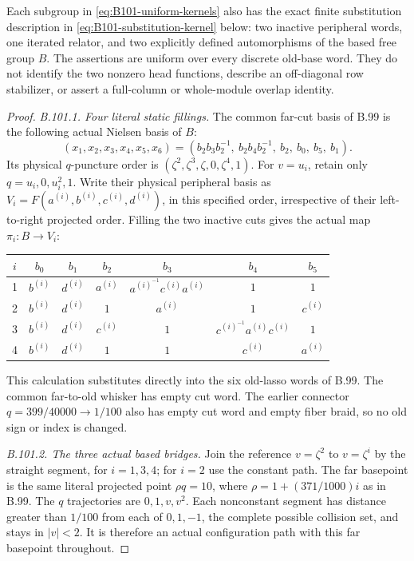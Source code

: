 Each subgroup in \eqref{eq:B101-uniform-kernels} also has the exact
finite substitution description in \eqref{eq:B101-substitution-kernel}
below: two inactive peripheral words, one iterated relator, and two
explicitly defined automorphisms of the based free group $B$.
The assertions are uniform over every discrete old-base word.
They do not identify the two nonzero head functions, describe an
off-diagonal row stabilizer, or assert a full-column or whole-module
overlap identity.

\begin{proof}
\emph{B.101.1. Four literal static fillings.}
The common far-cut basis of B.99 is the following actual Nielsen basis
of $B$:
\begin{equation}\label{eq:B101-six-cut-basis}
 (x_1,x_2,x_3,x_4,x_5,x_6)
 =(b_2b_3b_2^{-1},\ b_2b_4b_2^{-1},\ b_2,\ b_0,\ b_5,\ b_1).
\end{equation}
Its physical $q$-puncture order is
$(\zeta^2,\zeta^3,\zeta,0,\zeta^4,1)$.
For $v=u_i$, retain only $q=u_i,0,u_i^2,1$.
Write their physical peripheral basis as
$V_i=F(a^{(i)},b^{(i)},c^{(i)},d^{(i)})$, in this specified order, irrespective of
their left-to-right projected order.
Filling the two inactive cuts gives the actual map $\pi_i:B\to V_i$:
\begin{center}
\small
\begin{tabular}{c@{\qquad}cccccc}
\toprule
$i$&$b_0$&$b_1$&$b_2$&$b_3$&$b_4$&$b_5$\\
\midrule
1&$b^{(i)}$&$d^{(i)}$&$a^{(i)}$&$a^{(i)}^{-1}c^{(i)} a^{(i)}$&$1$&$1$\\
2&$b^{(i)}$&$d^{(i)}$&$1$&$a^{(i)}$&$1$&$c^{(i)}$\\
3&$b^{(i)}$&$d^{(i)}$&$c^{(i)}$&$1$&$c^{(i)}^{-1}a^{(i)} c^{(i)}$&$1$\\
4&$b^{(i)}$&$d^{(i)}$&$1$&$1$&$c^{(i)}$&$a^{(i)}$\\
\bottomrule
\end{tabular}
\end{center}
This calculation substitutes directly into the six old-lasso words
of B.99.  The common far-to-old whisker has empty cut word.
The earlier connector $q=399/40000\to1/100$ also has empty cut word
and empty fiber braid, so no old sign or index is changed.

\emph{B.101.2. The three actual based bridges.}
Join the reference $v=\zeta^2$ to $v=\zeta^i$ by the straight segment,
for $i=1,3,4$; for $i=2$ use the constant path.
The far basepoint is the same literal projected point $\rho q=10$,
where $\rho=1+(371/1000)i$ as in B.99.
The $q$ trajectories are $0,1,v,v^2$.
Each nonconstant segment has distance greater than $1/100$ from
each of $0,1,-1$, the complete possible collision set, and stays in
$|v|<2$.  It is therefore an actual configuration path with this far
basepoint throughout.


\end{proof}
